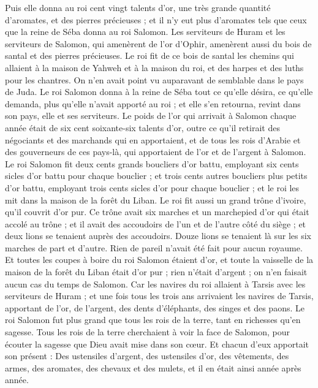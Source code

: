 \begin{multicols}{2}
Puis elle donna au roi cent vingt talents d'or, une très grande quantité d'aromates, et des pierres précieuses ; et il n'y eut plus d'aromates tels que ceux que la reine de Séba donna au roi Salomon.
Les serviteurs de Huram et les serviteurs de Salomon, qui amenèrent de l'or d'Ophir, amenèrent aussi du bois de santal et des pierres précieuses.
Le roi fit de ce bois de santal les chemins qui allaient à la maison de Yahweh et à la maison du roi, et des harpes et des luths pour les chantres. On n'en avait point vu auparavant de semblable dans le pays de Juda.
Le roi Salomon donna à la reine de Séba tout ce qu'elle désira, ce qu'elle demanda, plus qu'elle n'avait apporté au roi ; et elle s'en retourna, revint dans son pays, elle et ses serviteurs.
Le poids de l'or qui arrivait à Salomon chaque année était de six cent soixante-six talents d'or,
outre ce qu'il retirait des négociants et des marchands qui en apportaient, et de tous les rois d'Arabie et des gouverneurs de ces pays-là, qui apportaient de l'or et de l'argent à Salomon.
Le roi Salomon fit deux cents grands boucliers d'or battu, employant six cents sicles d'or battu pour chaque bouclier ;
et trois cents autres boucliers plus petits d'or battu, employant trois cents sicles d'or pour chaque bouclier ; et le roi les mit dans la maison de la forêt du Liban.
Le roi fit aussi un grand trône d'ivoire, qu'il couvrit d'or pur.
Ce trône avait six marches et un marchepied d'or qui était accolé au trône ; et il avait des accoudoirs de l'un et de l'autre côté du siège ; et deux lions se tenaient auprès des accoudoirs.
Douze lions se tenaient là sur les six marches de part et d'autre. Rien de pareil n'avait été fait pour aucun royaume.
Et toutes les coupes à boire du roi Salomon étaient d'or, et toute la vaisselle de la maison de la forêt du Liban était d'or pur ; rien n'était d'argent ; on n'en faisait aucun cas du temps de Salomon.
Car les navires du roi allaient à Tarsis avec les serviteurs de Huram ; et une fois tous les trois ans arrivaient les navires de Tarsis, apportant de l'or, de l'argent, des dents d'éléphants, des singes et des paons.
Le roi Salomon fut plus grand que tous les rois de la terre, tant en richesses qu’en sagesse.
Tous les rois de la terre cherchaient à voir la face de Salomon, pour écouter la sagesse que Dieu avait mise dans son cœur.
Et chacun d'eux apportait son présent : Des ustensiles d'argent, des ustensiles d'or, des vêtements, des armes, des aromates, des chevaux et des mulets, et il en était ainsi année après année.

\end{multicols}

